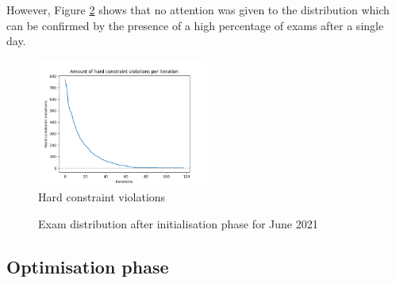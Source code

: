 However, Figure \ref{fig:init} shows that no attention was given to the distribution which can be confirmed by the presence of a high percentage of exams after a single day. 

\begin{figure}[H]
	\centering
	\includegraphics[width=0.5\textwidth]{images/init/conflicts.png} 
	\caption{Hard constraint violations}
	\label{fig:violations}
\end{figure}
\begin{figure}[H]
  \centering
  \hfill
  \caption{Exam distribution after initialisation phase for June 2021}
  \label{fig:init}
\end{figure}

\subsection{Optimisation phase}

